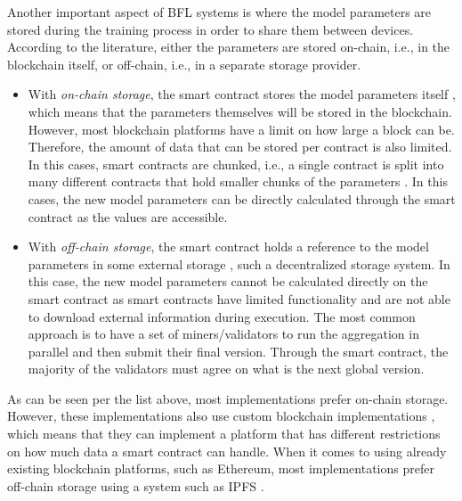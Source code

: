 Another important aspect of BFL systems is where the model parameters are stored during the training process in order to share them between devices. According to the literature, either the parameters are stored on-chain, i.e., in the blockchain itself, or off-chain, i.e., in a separate storage provider.

\begin{itemize}
    \item With \textit{on-chain storage}, the smart contract stores the model parameters itself \cite{9274451, baffle, demo, 8733825, 9524833, 8894364, 9184854, 8893114}, which means that the parameters themselves will be stored in the blockchain. However, most blockchain platforms have a limit on how large a block can be. Therefore, the amount of data that can be stored per contract is also limited. In this cases, smart contracts are chunked, i.e., a single contract is split into many different contracts that hold smaller chunks of the parameters \cite{9274451, baffle}. In this cases, the new model parameters can be directly calculated through the smart contract as the values are accessible.
    
    \item With \textit{off-chain storage}, the smart contract holds a reference to the model parameters in some external storage \cite{10.48550/arxiv.2202.02817, 10.48550/arxiv.1910.12603, 10.48550/arxiv.2007.03856, 8945913, Peyvandi2022, 9170559, 10.1145/3319535.3363256, 10.48550/arxiv.2011.07516}, such a decentralized storage system. In this case, the new model parameters cannot be calculated directly on the smart contract as smart contracts have limited functionality and are not able to download external information during execution. The most common approach is to have a set of miners/validators to run the aggregation in parallel and then submit their final version. Through the smart contract, the majority of the validators must agree on what is the next global version. 
\end{itemize}

As can be seen per the list above, most implementations prefer on-chain storage. However, these implementations also use custom blockchain implementations \cite{8733825, 9524833, 8894364, 9184854, 8893114}, which means that they can implement a platform that has different restrictions on how much data a smart contract can handle. When it comes to using already existing blockchain platforms, such as Ethereum, most implementations prefer off-chain storage using a system such as IPFS \cite{10.48550/arxiv.2007.03856, 8945913, Peyvandi2022, 9170559, 10.1145/3319535.3363256, 10.48550/arxiv.2011.07516}.

